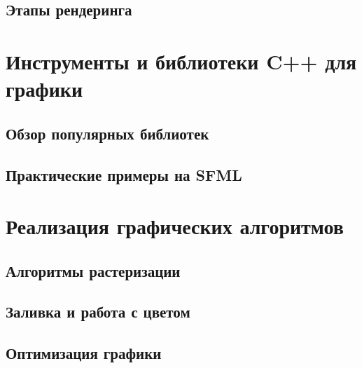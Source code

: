 \documentclass[referat]{SCWorks}
\begin{document}

\subsection{Этапы рендеринга}


\section{Инструменты и библиотеки C++ для графики}

\subsection{Обзор популярных библиотек}



\subsection{Практические примеры на SFML}



\section{Реализация графических алгоритмов}

\subsection{Алгоритмы растеризации}


\subsection{Заливка и работа с цветом}


\subsection{Оптимизация графики}


\conclusion






\appendix

\section{}


\end{document}
